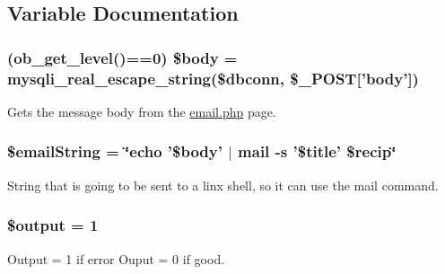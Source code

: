 \subsection{\-Variable \-Documentation}
\hypertarget{sendMail_8php_a3413c11d1f6b9e38ea54c7dffc0e5ea3}{
\subsubsection[{\$body}]{ (ob\-\_\-get\-\_\-level()==0) \$body = mysqli\-\_\-real\-\_\-escape\-\_\-string(\$dbconn, \$\-\_\-\-P\-O\-S\-T\mbox{[}'body'\mbox{]})}}\label{sendMail_8php_a3413c11d1f6b9e38ea54c7dffc0e5ea3}
\-Gets the message body from the \hyperlink{email_8php}{email.\-php} page. \hypertarget{sendMail_8php_a26bed4c7bf2dd10f80cfd792aba56800}{
\subsubsection[{\$email\-String}]{\setlength{\rightskip}{0pt plus 5cm}\$email\-String = \char`\"{}echo '\$body' $|$ mail -\/s '\$title' \$recip\char`\"{}}}\label{sendMail_8php_a26bed4c7bf2dd10f80cfd792aba56800}
\-String that is going to be sent to a linx shell, so it can use the mail command. \hypertarget{sendMail_8php_a73004ce9cd673c1bfafd1dc351134797}{
\subsubsection[{\$output}]{\setlength{\rightskip}{0pt plus 5cm}\$output = 1}}\label{sendMail_8php_a73004ce9cd673c1bfafd1dc351134797}
\-Output = 1 if error \-Ouput = 0 if good.

